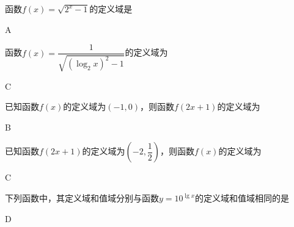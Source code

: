   \begin{exercise}
    \item
      函数$f(x)=\sqrt{2^x-1}$的定义域是\xz
      \begin{answer}
        A
      \end{answer}
    \item
      函数$f(x)=\dfrac{1}{\sqrt{\left(\log_2x\right)^2-1}}$的定义域为\xz
      \xx{$ \left(0,\dfrac{1}{2}\right)$}{$ \left(2,+\infty\right)$}{$ \left(0,\dfrac{1}{2}\right)\bigcup\left(2,+\infty\right)$}{$ \left(0,\dfrac{1}{2}\right]\bigcup\left[2,+\infty\right)$}
      \begin{answer}
        C
      \end{answer}
    \item
      已知函数$f(x)$的定义域为$(-1,0)$，则函数$f(2x+1)$的定义域为\xz
      \begin{answer}
        B
      \end{answer}
    \item
      已知函数$f(2x+1)$的定义域为$\left(-2,\dfrac{1}{2}\right)$，则函数$f(x)$的定义域为\xz
      \begin{answer}
        C
      \end{answer}
    \item
      下列函数中，其定义域和值域分别与函数$y=10^{\lg x}$的定义域和值域相同的是\xz
      \begin{answer}
        D
      \end{answer}
  \end{exercise}
